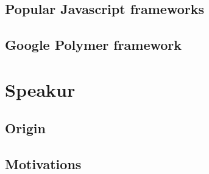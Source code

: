 \subsection{Popular Javascript frameworks}
\subsection{Google Polymer framework}

\section{Speakur}
\subsection{Origin}
\subsection{Motivations}

